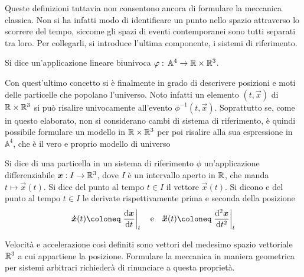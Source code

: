 Queste definizioni tuttavia non consentono ancora di formulare la meccanica classica. Non si ha infatti modo di identificare un punto nello spazio attraverso lo scorrere del tempo, siccome gli spazi di eventi contemporanei sono tutti separati tra loro. Per collegarli, si introduce l'ultima componente, i sistemi di riferimento.
\begin{definition}
  Si dice  un'applicazione lineare biunivoca $\varphi:\, \mathbb{A}^4 \to \mathbb{R}\times \mathbb{R}^3$. 
\end{definition}

Con quest'ultimo concetto si è finalmente in grado di descrivere posizioni e moti delle particelle che popolano l'universo. Noto infatti un elemento $(t,\vec{x})$ di $\mathbb{R} \times  \mathbb{R}^3$ si può risalire univocamente all'evento $\phi^{-1}(t,\vec{x})$. Soprattutto se, come in questo elaborato, non si considerano cambi di sistema di riferimento, è quindi possibile formulare un modello in $\mathbb{R} \times \mathbb{R}^3$ per poi risalire alla sua espressione in $\mathbb{A}^4$, che è il vero e proprio modello di universo
\begin{definition}
  Si dice  di una particella in un sistema di riferimento $\phi$ un'applicazione differenziabile $\boldsymbol{x}:I \to \mathbb{R}^3$, dove $I$ è un intervallo aperto in $\mathbb{R}$, che manda $t\mapsto \vec{x}(t)$. Si dice  del punto al tempo $t \in I$ il vettore $\vec{x}(t)$. Si dicono  e  del punto al tempo $t \in I$ le derivate rispettivamente prima e seconda della posizione \begin{equation}
  \vec{\dot{x}} (t) \defeq \eval{\dv{\vec{x}}{t}}_t \qqtext{e} \vec{\ddot{x}} (t) \defeq \eval{\dv[2]{\vec{x}}{t}}_t
  \end{equation} 
\end{definition}
\begin{remark}
  Velocità e accelerazione così definiti sono vettori del medesimo spazio vettoriale $\mathbb{R}^3$ a cui appartiene la posizione. Formulare la meccanica in maniera geometrica per sistemi arbitrari richiederà di rinunciare a questa proprietà.
\end{remark}


